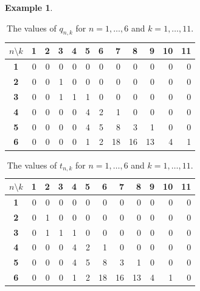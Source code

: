 \documentclass[12pt]{amsart}
\theoremstyle{definition}
\newtheorem{example}[theorem]{Example}
\begin{document}
\begin{example}
\begin{table}[H]
    \centering
    \label{tab:qnk_values}
    \setlength{\tabcolsep}{6pt}
    \renewcommand{\arraystretch}{1.2}
    \begin{tabular}{c|rrrrrrrrrrr}
        \toprule
        \boldmath$n \setminus k$ & \textbf{1} & \textbf{2} & \textbf{3} & \textbf{4} & \textbf{5} & \textbf{6} & \textbf{7} & \textbf{8} & \textbf{9} & \textbf{10} & \textbf{11} \\
        \midrule
        \textbf{1} & 0 & 0 & 0 & 0 & 0 & 0 & 0 & 0 & 0 & 0 & 0 \\
        \textbf{2} & 0 & 0 & 1 & 0 & 0 & 0 & 0 & 0 & 0 & 0 & 0 \\
        \textbf{3} & 0 & 0 & 1 & 1 & 1 & 0 & 0 & 0 & 0 & 0 & 0 \\
        \textbf{4} & 0 & 0 & 0 & 0 & 4 & 2 & 1 & 0 & 0 & 0 & 0 \\
        \textbf{5} & 0 & 0 & 0 & 0 & 4 & 5 & 8 & 3 & 1 & 0 & 0 \\
        \textbf{6} & 0 & 0 & 0 & 0 & 1 & 2 & 18 & 16 & 13 & 4 & 1 \\
        \bottomrule
    \end{tabular}
    \caption{The values of $q_{n,k}$ for $n=1,\ldots,6$ and $k=1,\ldots,11$.}
\end{table}

\begin{table}[H]
    \centering
    \label{tab:tnk_values}
    \setlength{\tabcolsep}{6pt}
    \renewcommand{\arraystretch}{1.2}
    \begin{tabular}{c|rrrrrrrrrrr}
        \toprule
        \boldmath$n \setminus k$ & \textbf{1} & \textbf{2} & \textbf{3} & \textbf{4} & \textbf{5} & \textbf{6} & \textbf{7} & \textbf{8} & \textbf{9} & \textbf{10} & \textbf{11} \\
        \midrule
        \textbf{1} & 0 & 0 & 0 & 0 & 0 & 0 & 0 & 0 & 0 & 0 & 0 \\
        \textbf{2} & 0 & 1 & 0 & 0 & 0 & 0 & 0 & 0 & 0 & 0 & 0 \\
        \textbf{3} & 0 & 1 & 1 & 1 & 0 & 0 & 0 & 0 & 0 & 0 & 0 \\
        \textbf{4} & 0 & 0 & 0 & 4 & 2 & 1 & 0 & 0 & 0 & 0 & 0 \\
        \textbf{5} & 0 & 0 & 0 & 4 & 5 & 8 & 3 & 1 & 0 & 0 & 0 \\
        \textbf{6} & 0 & 0 & 0 & 1 & 2 & 18 & 16 & 13 & 4 & 1 & 0 \\
        \bottomrule
    \end{tabular}
    \caption{The values of $t_{n,k}$ for $n=1,\ldots,6$ and $k=1,\ldots,11$.}
\end{table}


\end{example}
\end{document}
